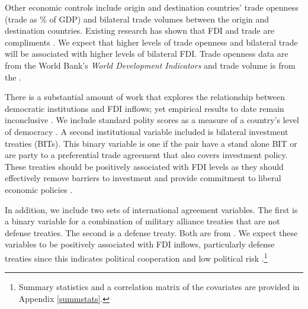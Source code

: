 \documentclass[reqno,onecolumn,letterpaper,12pt]{article}
\begin{document}
Other economic controls include origin and destination countries' trade openness (trade as \% of GDP) and bilateral trade volumes between the origin and destination countries. Existing research has shown that FDI and trade are compliments \citep{aizenman2006fdi,Markusen:1995}. We expect that higher levels of trade openness and bilateral trade will be associated with higher levels of bilateral FDI. Trade openness data are from the World Bank's \textit{World Development Indicators} and trade volume is from the \citet{OECD}.

There is a substantial amount of work that explores the relationship between democratic institutions and FDI inflows; yet empirical results to date remain inconclusive \citep[see,~e.g.,][]{Jensen:2003,Li_Resnick:2003,Jakobsen_DeSoysa:2006,Resnick:2001,Li_et_al:2016}. We include standard polity scores as a measure of a country's level of democracy \citep{Marshall_Jaggers:2010}. A second institutional variable included is bilateral investment treaties (BITs). This binary variable is one if the pair have a stand alone BIT or are party to a preferential trade agreement that also covers investment policy. These treaties should be positively associated with FDI levels as they should effectively remove barriers to investment and provide commitment to liberal economic policies \citep{Kerner:2009,Buthe_Milner:2008,Allee_Peinhardt:2011}. %

In addition, we include two sets of international agreement variables. The first is a binary variable for a combination of military alliance treaties that are not defense treaties. The second is a defense treaty. Both are from \citet{Gibler09}. We expect these variables to be positively associated with FDI inflows, particularly defense treaties since this indicates political cooperation and low political risk \citep{Li_Vashchilko:2010}.\footnote{Summary statistics and a correlation matrix of the covariates are provided in Appendix \ref{summstats}.}



\end{document}
